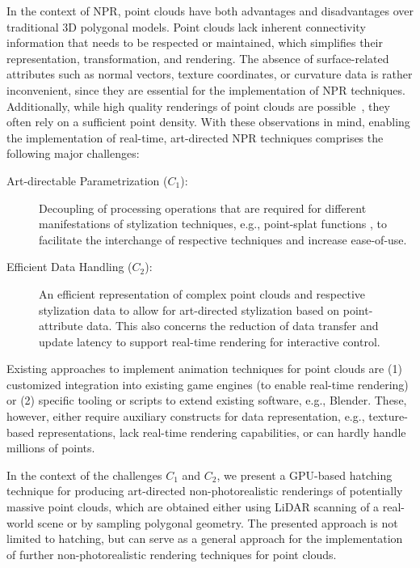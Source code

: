 \documentclass[a4paper,twoside]{article}
\newcommand{\eg}{e.g.,\xspace}
\begin{document}
In the context of \ac{NPR}, point clouds have both advantages and disadvantages over traditional 3D polygonal models.
Point clouds lack inherent connectivity information that needs to be respected or maintained, which simplifies their representation, transformation, and rendering.
The absence of surface-related attributes such as normal vectors, texture coordinates, or curvature data is rather inconvenient, since they are essential for the implementation of \ac{NPR} techniques.
Additionally, while high quality renderings of point clouds are possible~\cite{Schuetz2015,Schuetz2021}, they often rely on a sufficient point density.
With these observations in mind, enabling the implementation of real-time, art-directed \ac{NPR} techniques comprises the following major challenges:

\begin{description}
    \item[Art-directable Parametrization ($C_1$):] 
        Decoupling of processing operations that are required for different manifestations of stylization techniques, \eg point-splat functions \cite{Anjos2018}, to facilitate the interchange of respective techniques and increase ease-of-use.
    \item[Efficient Data Handling ($C_2$):] 
        An efficient representation of complex point clouds and respective stylization data to allow for art-directed stylization based on point-attribute data. This also concerns the reduction of data transfer and update latency to support real-time rendering for interactive control.
\end{description}

Existing approaches to implement animation techniques for point clouds are
  (1) customized integration into existing game engines (to enable real-time rendering) or 
  (2) specific tooling or scripts to extend existing software, \eg Blender.
These, however, either require auxiliary constructs for data representation, \eg texture-based representations, lack real-time rendering capabilities, or can hardly handle millions of points.


In the context of the challenges $C_1$ and $C_2$, we present a \ac{GPU}-based hatching technique
for producing art-directed non-photorealistic renderings of potentially massive point clouds, which  
are obtained either using \ac{LiDAR} scanning of a real-world scene or by sampling polygonal geometry.
The presented approach is not limited to hatching, but can serve as a general approach for the implementation of further non-photorealistic rendering techniques for point clouds.
\end{document}
